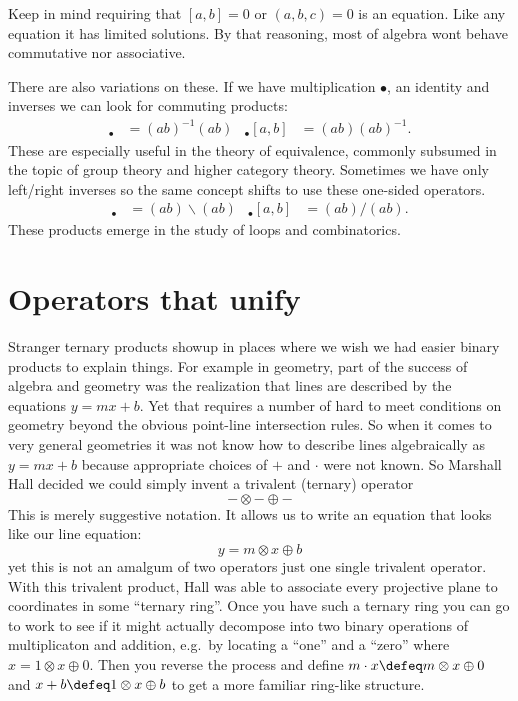 Keep in mind requiring that $[a,b]=0$ or $(a,b,c)=0$ is an equation. 
Like any equation it has limited solutions.  By that reasoning, 
most of algebra wont behave commutative nor associative.

There are also variations on these.  If we have multiplication $\bullet$, 
an identity and inverses we can look for commuting products:
\begin{align*}
    [a,b]_{\bullet} & =(ab)^{-1}(ab)
    &
    {_{\bullet} [a,b]} & =(ab)(ab)^{-1}.
\end{align*}
These are especially useful in the  theory of equivalence, commonly subsumed 
in the topic of group theory and higher category theory.
Sometimes we have only left/right inverses so the same concept shifts to 
use these one-sided operators.
\begin{align*}
    [a,b]_{\bullet} & =(ab)\backslash (ab)
    &
    {_{\bullet} [a,b]} & =(ab)/(ab).
\end{align*}
These products emerge in the study of loops and combinatorics.

\section{Operators that unify}
Stranger ternary products showup in places where we wish we had easier binary products 
to explain things.  For example in geometry, part of the success of algebra and 
geometry was the realization that lines are described by the equations $y=mx+b$.
Yet that requires a number of hard to meet conditions on geometry beyond the obvious 
point-line intersection rules.  So when it comes to very general geometries 
it was not know how to describe lines algebraically as $y=mx+b$ because 
appropriate choices of $+$ and $\cdot$ were not known.
So Marshall Hall decided we could simply invent a trivalent (ternary) operator
\[
    -\otimes-\oplus -
\]
This is merely suggestive notation.  It allows us to write an equation 
that looks like our line equation:
\[
    y=m\otimes x\oplus b
\] 
yet this is not an amalgum of two operators just one single trivalent operator.
With this trivalent product, Hall was able to associate every 
projective plane to coordinates in some ``ternary ring''.  Once you have such a ternary ring you 
can go to work to see if it might actually decompose into two binary operations of multiplicaton 
and addition, e.g.\ by locating a ``one'' and a ``zero'' where $x=1\otimes x\oplus 0$.  Then 
you reverse the process and define $m\cdot x\defeq m\otimes x\oplus 0$ and $x+b\defeq 1\otimes x\oplus b$
to get a more familiar ring-like structure.


